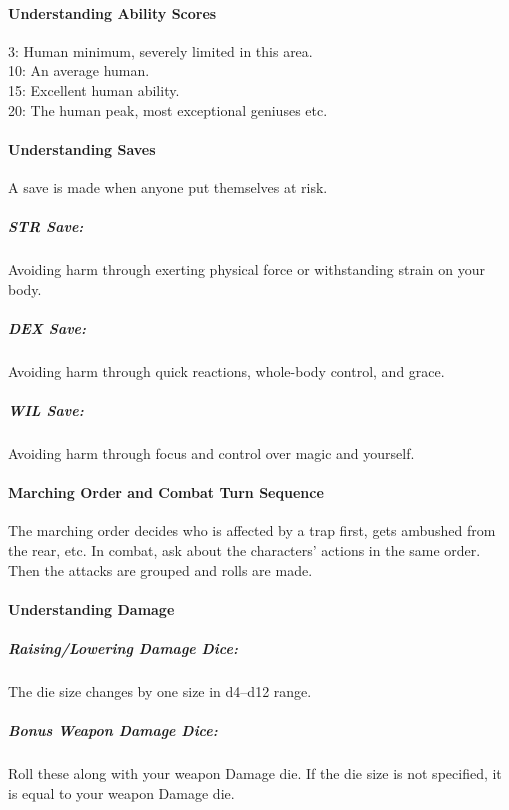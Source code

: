 \documentclass[itdr]{subfiles}
\begin{document}
\paragraph{Understanding Ability Scores}
3: Human minimum, severely limited in this area.\\
10: An average human.\\
15: Excellent human ability.\\
20: The human peak, most exceptional geniuses etc.

\vfill

\paragraph{Understanding Saves}
A save is made when anyone put themselves at risk.

\subparagraph{STR Save:} Avoiding harm through exerting physical force or withstanding strain on your body.

\subparagraph{DEX Save:} Avoiding harm through quick reactions, whole-body control, and grace.

\subparagraph{WIL Save:} Avoiding harm through focus and control over magic and yourself.

\vfill
\break

\paragraph{Marching Order and Combat Turn Sequence}
The marching order decides who is affected by a trap first, gets ambushed from the rear, etc. In combat, ask about the characters' actions in the same order. Then the attacks are grouped and rolls are made.

\vfill

\paragraph{Understanding Damage}
\subparagraph{Raising/Lowering Damage Dice:} The die size changes by one size in d4--d12 range.

\subparagraph{Bonus Weapon Damage Dice:} Roll these along with your weapon Damage die. If the die size is not \mbox{specified}, it is equal to your weapon Damage die.
\end{document}
